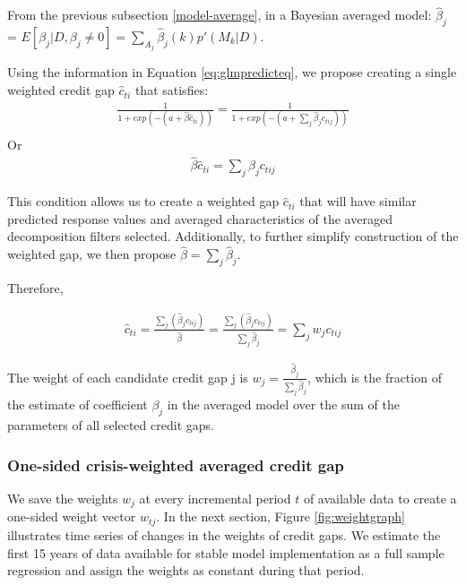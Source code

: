 \documentclass[
  12pt,
]{article}
\begin{document}
From the previous subsection \ref{model-average}, in a Bayesian averaged model: \(\hat{\beta}_j\) = \(E[\beta_j|D, \beta_j\ne 0] = \sum\limits_{A_j} \hat{\beta}_j(k)p'(M_k|D)\).

Using the information in Equation \eqref{eq:glmpredicteq}, we propose creating a single weighted credit gap \(\hat{c}_{ti}\) that satisfies:
\begin{align*}
\frac {1}{1+exp(-(a+\hat{\beta} \hat{c}_{ti}))}= \frac {1}{1+exp(-(a+\sum\nolimits_j \hat{\beta}_j c_{tij}))} \\
\end{align*}
Or
\begin{align}
\hat{\beta} \hat{c}_{ti} = \sum\limits_j \hat{\beta}_j c_{tij}
\end{align}

This condition allows us to create a weighted gap \(\hat{c}_{ti}\) that will have similar predicted response values and averaged characteristics of the averaged decomposition filters selected. Additionally, to further simplify construction of the weighted gap, we then propose \(\hat{\beta} = \sum\nolimits_j \hat{\beta}_j\).

Therefore,

\begin{align}
\hat{c}_{ti} = \frac{\sum\nolimits_j (\hat{\beta}_j c_{tij})}{\hat{\beta}} = \frac{\sum\nolimits_j (\hat{\beta}_j c_{tij})}{\sum\nolimits_j\hat{\beta}_j} = \sum\nolimits_j w_j c_{tij}
\end{align}

The weight of each candidate credit gap j is \(w_j = \frac{\hat{\beta}_j}{\sum\nolimits_j\hat{\beta}_j}\), which is the fraction of the estimate of coefficient \(\beta_j\) in the averaged model over the sum of the parameters of all selected credit gaps.

\hypertarget{one-sided-crisis-weighted-averaged-credit-gap}{%
\subsubsection{One-sided crisis-weighted averaged credit gap}\label{one-sided-crisis-weighted-averaged-credit-gap}}

We save the weights \(w_j\) at every incremental period \(t\) of available data to create a one-sided weight vector \(w_{tj}\). In the next section, Figure \ref{fig:weightgraph} illustrates time series of changes in the weights of credit gaps. We estimate the first 15 years of data available for stable model implementation as a full sample regression and assign the weights as constant during that period.
\end{document}
